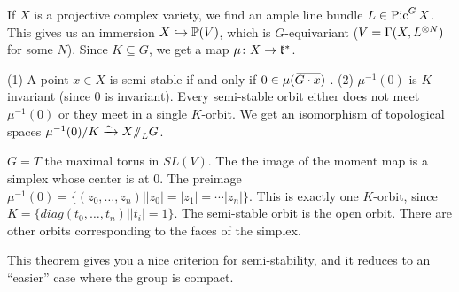 If $X$ is a projective complex variety, we find an ample line bundle $L\in \operatorname{Pic}^GX$. This gives us an immersion $X\hookrightarrow \mathbb{P}(V)$, which is $G$-equivariant ($V=\Gamma(X,L^{\otimes N})$ for some $N$). Since $K\subseteq G$, we get a map $\mu\colon X\to \mathfrak{k}^*$.
\begin{theorem}
 (1) A point $x\in X$ is semi-stable if and only if $0\in \mu(\bbar{G\cdot x})$ . (2) $\mu^{-1}(0)$ is $K$-invariant (since $0$ is invariant). Every semi-stable orbit either does not meet $\mu^{-1}(0)$ or they meet in a single $K$-orbit. We get an isomorphism of topological spaces $\mu^{-1}(0)/K\xrightarrow\sim X\mbox{\rm /\!\!/}_L G$.
\end{theorem}
\begin{example}
 $G=T$ the maximal torus in $SL(V)$. The the image of the moment map is a simplex whose center is at $0$. The preimage $\mu^{-1}(0)=\{(z_0,\dots, z_n)| |z_0|=|z_1|=\cdots |z_n|\}$. This is exactly one $K$-orbit, since $K=\{diag(t_0,\dots, t_n)||t_i|=1\}$. The semi-stable orbit is the open orbit. There are other orbits corresponding to the faces of the simplex.
\end{example}
This theorem gives you a nice criterion for semi-stability, and it reduces to an ``easier'' case where the group is compact.


